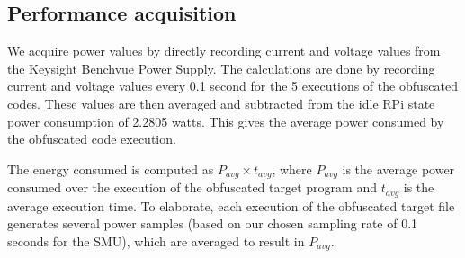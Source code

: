 \subsection{Performance acquisition}\label{subsec:pdoc}

We acquire power values by directly recording current and voltage values from the Keysight Benchvue Power Supply. The calculations are done by recording current and voltage values every 0.1 second for the 5 executions of the obfuscated codes. These values are then averaged and subtracted from the idle RPi state power consumption of 2.2805 watts. This gives the  average power consumed by the obfuscated code execution.

The energy consumed is computed as $P_\mathit{avg} \times t_\mathit{avg}$, where $P_\mathit{avg}$ is the average power consumed over the execution of the obfuscated target program and $t_\mathit{avg}$ is the average execution time. To elaborate, each execution of the obfuscated target file generates several power samples (based on our chosen sampling rate of 0.1 seconds for the SMU), which are averaged to result in $P_\mathit{avg}$. 
